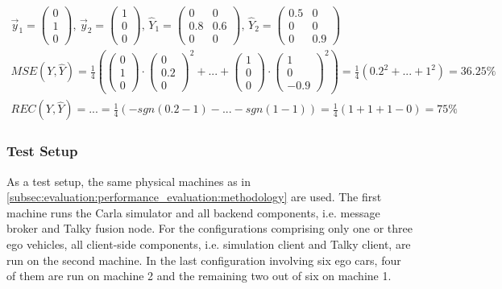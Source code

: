 \begin{gather*}
	\vec{y}_1 = \begin{pmatrix}0 \\ 1 \\ 0 \end{pmatrix} \text{,\ } \vec{y}_2 = \begin{pmatrix}1 \\ 0 \\ 0 \end{pmatrix} \text{,\ }
	\hat{Y}_1 = \begin{pmatrix}
	0 & 0 \\
	0.8 & 0.6 \\
	0 & 0
	\end{pmatrix} \text{,\ }
	\hat{Y}_2 = \begin{pmatrix}
	0.5 & 0 \\
	0 & 0 \\
	0 & 0.9
	\end{pmatrix} \\
	\textit{MSE}(Y, \hat{Y}) = \frac{1}{4} (\begin{pmatrix}0 \\ 1 \\ 0 \end{pmatrix} \cdot \begin{pmatrix}0 \\ 0.2 \\ 0 \end{pmatrix}^2 + \text{...} + \begin{pmatrix}1 \\ 0 \\ 0 \end{pmatrix} \cdot \begin{pmatrix}1 \\ 0 \\ -0.9 \end{pmatrix}^2) = \frac{1}{4} (0.2^2 + \text{...} + 1^2) = 36.25 \% \\
	\textit{REC}(Y, \hat{Y}) = \text{...} = \frac{1}{4} (-\textit{sgn}(0.2-1) - \text{...} -\textit{sgn}(1-1)) = \frac{1}{4} (1+1+1-0) = 75 \%
\end{gather*}

\subsubsection{Test Setup}
As a test setup, the same physical machines as in \cref{subsec:evaluation:performance_evaluation:methodology} are used. The first machine runs the Carla simulator and all backend components, i.e. message broker and Talky fusion node. For the configurations comprising only one or three ego vehicles, all client-side components, i.e. simulation client and Talky client, are run on the second machine. In the last configuration involving six ego cars, four of them are run on machine 2 and the remaining two out of six on machine 1.

